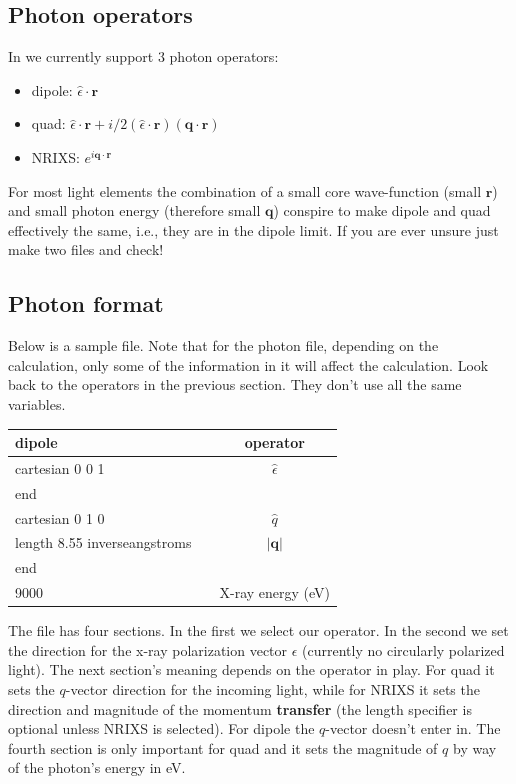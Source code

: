 \documentclass[11pt]{report}
\begin{document}
\subsection{Photon operators}
In  we currently support 3 photon operators: 
\begin{itemize}
\item dipole: $\hat{\epsilon} \cdot \mathbf{r}$
\item quad: $\hat{\epsilon} \cdot \mathbf{r} + i/2 \left( \hat{\epsilon} \cdot \mathbf{r} \right) \left(\mathbf{q} \cdot \mathbf{r} \right)$
\item NRIXS: $e^{i \mathbf{q} \cdot \mathbf{r} }$
\end{itemize}
For most light elements the combination of a small core 
wave-function (small $\mathbf{r}$) and small photon energy (therefore small $\mathbf{q}$) 
conspire to make dipole and quad effectively the same, i.e., they are in the dipole limit. 
If you are ever unsure just make two  files and check!

\subsection{Photon format}
Below is a sample  file. Note that for the photon file, 
depending on the calculation, only some of the information in it will affect the calculation. 
Look back to the operators in the previous section. They don't use all the same variables. 

\begin{center}
\begin{tabular}{| l | c c|}
\hline
dipole				& & operator \\
\hline
cartesian  0  0  1		& & $\hat{\epsilon}$  \\
end			& & \\
\hline
cartesian  0  1  0		& & $\hat{q}$  \\
length 8.55 inverseangstroms && $\vert \mathbf{q} \vert$ \\
end			& & \\
\hline
9000 & & X-ray energy (eV) \\
\hline
\end{tabular}
\end{center}

The file has four sections. In the first we select our operator. 
In the second we set the direction for the x-ray polarization vector $\epsilon$ (currently no circularly polarized light). 
The next section's meaning depends on the operator in play. 
For quad it sets the $q$-vector direction for the incoming light, 
while for NRIXS it sets the direction and magnitude of the momentum \textbf{transfer} 
(the length specifier is optional unless NRIXS is selected). For dipole the $q$-vector doesn't enter in. 
The fourth section is only important for quad and it sets the magnitude of $q$ by way of the photon's energy in eV. 
\end{document}
